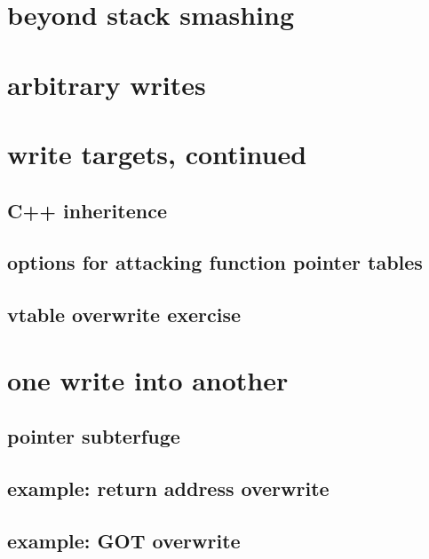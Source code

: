 

\section{beyond stack smashing}


\section{arbitrary writes}


\section{write targets, continued}

\subsection{C++ inheritence}


\subsection{options for attacking function pointer tables}


\subsection{vtable overwrite exercise}


\section{one write into another}

\subsection{pointer subterfuge}


\subsection{example: return address overwrite}


\subsection{example: GOT overwrite}


